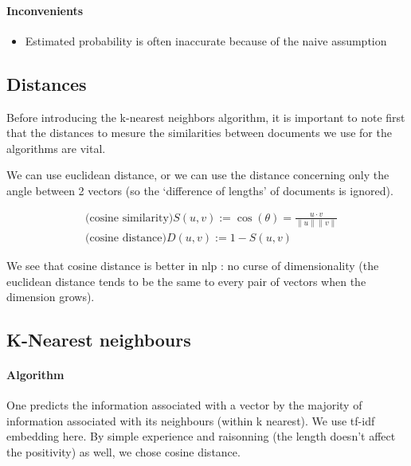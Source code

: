 \documentclass{article}
\begin{document}
\paragraph{Inconvenients} \begin{itemize}
\item Estimated probability is often inaccurate because of the naive assumption
\end{itemize}

\subsection{Distances}

Before introducing the k-nearest neighbors algorithm,
it is important to note first that the distances to mesure the similarities between documents we use for the algorithms are vital.

We can use euclidean distance, or we can use the distance concerning
only the angle between 2 vectors (so the `difference of lengths' of documents
is ignored).

\begin{minipage}{\textwidth}
\begin{minipage}{0.49\textwidth}
$$
\begin{aligned}
&\text{(cosine similarity)}S(u, v) :=
\cos (\theta)=\frac{u \cdot v}{\|u\|\|v\|}\\
&\text{(cosine distance)}D(u, v) :=1-S(u, v)
\end{aligned}
$$
\end{minipage}
\centering
\begin{minipage}{0.49\textwidth}

\end{minipage}
\end{minipage}

We see that cosine distance is better in nlp : no curse of dimensionality (the euclidean
distance tends to be the same to every pair of vectors when the dimension grows).

\subsection{K-Nearest neighbours}
\label{subset:KNN}

\paragraph{Algorithm} One predicts the information associated with a vector by the majority
of information associated with its neighbours (within k nearest).
We use tf-idf embedding here.
By simple experience
and raisonning (the length doesn't affect the positivity) as well, we chose cosine distance.
\end{document}
